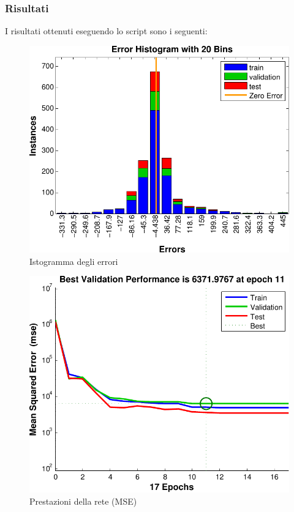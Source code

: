 \inputminted[linenos=true,fontsize=\footnotesize]{matlab}{../../src/netfit.m}


\subsubsection{Risultati}
I risultati ottenuti eseguendo lo script sono i seguenti:

\begin{figure}
  \centering
  \includegraphics[scale=0.7]{images/neural_net/histogram.pdf}
  \caption{Istogramma degli errori}
\end{figure}

\begin{figure}
  \centering
  \includegraphics[scale=0.7]{images/neural_net/performances.pdf}
  \caption{Prestazioni della rete (MSE)}
\end{figure}

